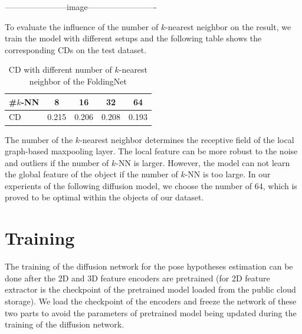 \documentclass[12pt,DIV14,BCOR12mm,a4paper,footinclude=false,headinclude,parskip=half-,twoside,openright,cleardoublepage=empty,toc=index,bibliography=totoc,listof=totoc]{scrreprt}
\numberwithin{equation}{chapter}
\begin{document}
-----------------------image-------------------------

To evaluate the influence of the number of $k$-nearest neighbor on the result, we train the model with different setups and the following table shows the corresponding CDs on the test dataset.
\begin{table}[h]
  \centering
  \caption{CD with different number of $k$-nearest neighbor of the FoldingNet}
  \label{tab:fold_knn}
  \begin{tabular}{l c c c c}
    \toprule
    \#$k$-NN & 8 & 16 & 32 & 64\\
    \midrule
    CD & 0.215 & 0.206 & 0.208 & 0.193\\
    \bottomrule
  \end{tabular}
\end{table}

The number of the $k$-nearest neighbor determines the receptive field of the local graph-based maxpooling layer. The local feature can be more robust to the noise and outliers if the number of $k$-NN is larger. However, the model can not learn the global feature of the object if the number of $k$-NN is too large. In our experients of the following diffusion model, we choose the number of 64, which is proved to be optimal within the objects of our dataset.

\section{Training} 
The training of the diffusion network for the pose hypotheses estimation can be done after the 2D and 3D feature encoders are pretrained (for 2D feature extractor is the checkpoint of the pretrained model loaded from the public cloud storage). We load the checkpoint of the encoders and freeze the network of these two parts to avoid the parameters of pretrained model being updated during the training of the diffusion network. 
\end{document}
